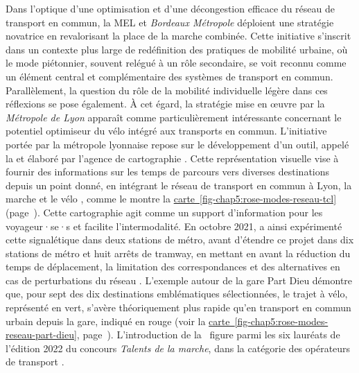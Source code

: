 \begin{refsegment}
Dans l'optique d'une optimisation et d'une décongestion efficace du réseau de transport en commun, la \acrshort{MEL} et \textsl{Bordeaux Métropole} déploient une stratégie novatrice en revalorisant la place de la marche combinée. Cette initiative s'inscrit dans un contexte plus large de redéfinition des pratiques de mobilité urbaine, où le mode piétonnier, souvent relégué à un rôle secondaire, se voit reconnu comme un élément central et complémentaire des systèmes de transport en commun. Parallèlement, la question du rôle de la mobilité individuelle légère dans ces réflexions se pose également. À cet égard, la stratégie mise en œuvre par la \textsl{Métropole de Lyon} apparaît comme particulièrement intéressante concernant le potentiel optimiseur du vélo intégré aux transports en commun. L'initiative portée par la métropole lyonnaise repose sur le développement d'un outil, appelé la  et élaboré par l'agence de cartographie . Cette représentation visuelle vise à fournir des informations sur les temps de parcours vers diverses destinations depuis un point donné, en intégrant le réseau de transport en commun à Lyon, la marche et le vélo \textcolor{blue}{\autocite{latitude-cartagene_rose_nodate}}, comme le montre la \hyperref[fig-chap5:rose-modes-reseau-tcl]{carte~\ref{fig-chap5:rose-modes-reseau-tcl}} (page~\pageref{fig-chap5:rose-modes-reseau-tcl}). Cette \gls{cartographie} agit comme un support d'information pour les voyageur·se·s et facilite l'intermodalité. En octobre 2021, \textcolor{blue}{\textcite[15]{keolis_lyon_rapport_2022}} a ainsi expérimenté cette signalétique dans deux stations de métro, avant d'étendre ce projet dans dix stations de métro et huit arrêts de tramway, en mettant en avant la réduction du temps de déplacement, la limitation des correspondances et des alternatives en cas de perturbations du réseau \textcolor{blue}{\autocite[15]{keolis_lyon_rapport_2022}}. L'exemple autour de la gare Part Dieu démontre que, pour sept des dix destinations emblématiques sélectionnées, le trajet à vélo, représenté en vert, s'avère théoriquement plus rapide qu'en transport en commun urbain depuis la gare, indiqué en rouge (voir la \hyperref[fig-chap5:rose-modes-reseau-part-dieu]{carte~\ref{fig-chap5:rose-modes-reseau-part-dieu}}, page~\pageref{fig-chap5:rose-modes-reseau-part-dieu}). L'introduction de la ~figure parmi les six lauréats de l'édition 2022 du concours \textsl{Talents de la marche}, dans la catégorie des opérateurs de transport \textcolor{blue}{\autocite{club_des_villes_et_territoires_cyclables_six_nodate}}.%


\end{refsegment}
